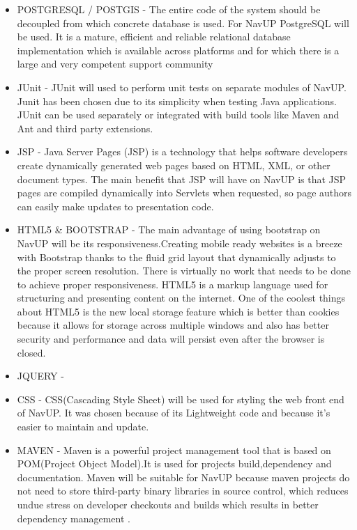 \begin{itemize}
	\item POSTGRESQL / POSTGIS - The entire code of the system should be decoupled from which concrete database is used. For NavUP PostgreSQL will be used. It is a mature, efficient and reliable relational database implementation which is available across platforms and for which there is a large and very competent support community
	
	\item JUnit - JUnit will used to perform unit tests on separate modules of NavUP. Junit has been chosen due to its simplicity when testing Java applications. JUnit can be used separately or integrated with build tools like Maven and Ant and third party extensions.
	
	\item JSP - Java Server Pages (JSP) is a technology that helps software developers create dynamically generated web pages based on HTML, XML, or other document types. The main benefit that JSP will have on NavUP is that JSP pages are compiled dynamically into Servlets when requested, so page authors can easily make updates to presentation code.
	
	\item HTML5 \& BOOTSTRAP - The main advantage of using bootstrap on NavUP will be its responsiveness.Creating mobile ready websites is a breeze with Bootstrap thanks to the fluid grid layout that dynamically adjusts to the proper screen resolution. There is virtually no work that needs to be done to achieve proper responsiveness. HTML5 is a markup language used for structuring and presenting content on the internet. One of the coolest things about HTML5 is the new local storage feature which is better than cookies because it allows for storage across multiple windows and also has better security and performance and data will persist even after the browser is closed.
	
	\item JQUERY - 
	
	\item CSS - CSS(Cascading Style Sheet) will be used for styling the web front end of NavUP. It was chosen because of its Lightweight code and because it's easier to maintain and update. 
	
	\item MAVEN - Maven is a powerful project management tool that is based on POM(Project Object Model).It is used for projects build,dependency and documentation. Maven will be suitable for NavUP because maven projects do not need to store third-party binary libraries in source control, which reduces undue stress on developer checkouts and builds which results in better dependency management
.	
	

\end{itemize}
